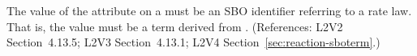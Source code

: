 The value of the  attribute on a \KineticLaw must be an SBO
identifier referring to a rate law.  That is, the value must be a term
derived from \sboratelaw.  (References: L2V2 Section~4.13.5; L2V3
Section~4.13.1; L2V4 Section~\ref{sec:reaction-sboterm}.)
